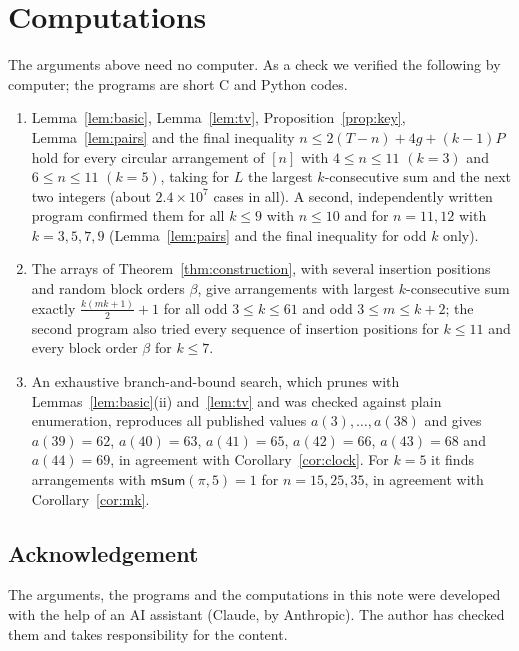 \documentclass[11pt]{amsart}
\theoremstyle{remark}
\newcommand{\msum}{\mathsf{msum}}
\begin{document}
\section{Computations}

The arguments above need no computer. As a check we verified the following by computer; the programs are short
C and Python codes.
\begin{enumerate}
\item Lemma~\ref{lem:basic}, Lemma~\ref{lem:tv}, Proposition~\ref{prop:key}, Lemma~\ref{lem:pairs} and the final
inequality $n\le 2(T-n)+4g+(k-1)P$ hold for every circular arrangement of $[n]$ with $4\le n\le11$ $(k=3)$ and
$6\le n\le 11$ $(k=5)$, taking for $L$ the largest $k$-consecutive sum and the next two integers (about
$2.4\times10^7$ cases in all). A second, independently written program confirmed them for all $k\le9$ with
$n\le10$ and for $n=11,12$ with $k=3,5,7,9$ (Lemma~\ref{lem:pairs} and the final inequality for odd $k$ only).
\item The arrays of Theorem~\ref{thm:construction}, with several insertion positions and random block orders
$\beta$, give arrangements with largest $k$-consecutive sum exactly $\frac{k(mk+1)}2+1$ for all odd $3\le k\le61$
and odd $3\le m\le k+2$; the second program also tried every sequence of insertion positions for $k\le 11$ and
every block order $\beta$ for $k\le7$.
\item An exhaustive branch-and-bound search, which prunes with Lemmas~\ref{lem:basic}(ii) and~\ref{lem:tv} and was
checked against plain enumeration, reproduces all published values $a(3),\dots,a(38)$ and
gives $a(39)=62$, $a(40)=63$, $a(41)=65$, $a(42)=66$, $a(43)=68$ and $a(44)=69$, in agreement with
Corollary~\ref{cor:clock}. For $k=5$ it finds
arrangements with $\msum(\pi,5)=1$ for $n=15,25,35$, in agreement with Corollary~\ref{cor:mk}.
\end{enumerate}

\subsection*{Acknowledgement}
The arguments, the programs and the computations in this note were developed with the help of an AI assistant
(Claude, by Anthropic). The author has checked them and takes responsibility for the content.
\end{document}
